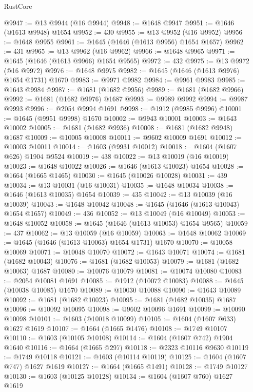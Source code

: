 \begin{lexlean}{RustCore}
\begin{coremodule}
@9947 := @13 @9944 (@16 @9944)
@9948 := @1648 @9947
@9951 := @1646 (@1613 @9948) @1654
@9952 := 430
@9955 := @13 @9952 (@16 @9952)
@9956 := @1648 @9955
@9961 := @1645 (@1646 (@1613 @9956) @1654 @1657)
@9962 := 431
@9965 := @13 @9962 (@16 @9962)
@9966 := @1648 @9965
@9971 := @1645 (@1646 (@1613 @9966) @1654 @9565)
@9972 := 432
@9975 := @13 @9972 (@16 @9972)
@9976 := @1648 @9975
@9982 := @1645 (@1646 (@1613 @9976) @1654 @1731) @1670
@9983 := @9971 @9982
@9984 := @9961 @9983
@9985 := @1643 @9984
@9987 := @1681 (@1682 @9956)
@9989 := @1681 (@1682 @9966)
@9992 := @1681 (@1682 @9976) @1687
@9993 := @9989 @9992
@9994 := @9987 @9993
@9996 := @2054 @9994 @1691
@9998 := @1912 (@9985 @9996)
@10001 := @1645 (@9951 @9998) @1670
@10002 := @9943 @10001
@10003 := @1643 @10002
@10005 := @1681 (@1682 @9936)
@10008 := @1681 (@1682 @9948) @1687
@10009 := @10005 @10008
@10011 := @9602 @10009 @1691
@10012 := @10003 @10011
@10014 := @1603 (@9931 @10012)
@10018 := @1604 (@1607 @626) @1904 @9524
@10019 := 438
@10022 := @13 @10019 (@16 @10019)
@10023 := @1648 @10022
@10026 := @1646 (@1613 @10023) @1654
@10028 := @1664 (@1665 @1465)
@10030 := @1645 (@10026 @10028)
@10031 := 439
@10034 := @13 @10031 (@16 @10031)
@10035 := @1648 @10034
@10038 := @1646 (@1613 @10035) @1654
@10039 := 435
@10042 := @13 @10039 (@16 @10039)
@10043 := @1648 @10042
@10048 := @1645 (@1646 (@1613 @10043) @1654 @1657)
@10049 := 436
@10052 := @13 @10049 (@16 @10049)
@10053 := @1648 @10052
@10058 := @1645 (@1646 (@1613 @10053) @1654 @9565)
@10059 := 437
@10062 := @13 @10059 (@16 @10059)
@10063 := @1648 @10062
@10069 := @1645 (@1646 (@1613 @10063) @1654 @1731) @1670
@10070 := @10058 @10069
@10071 := @10048 @10070
@10072 := @1643 @10071
@10074 := @1681 (@1682 @10043)
@10076 := @1681 (@1682 @10053)
@10079 := @1681 (@1682 @10063) @1687
@10080 := @10076 @10079
@10081 := @10074 @10080
@10083 := @2054 @10081 @1691
@10085 := @1912 (@10072 @10083)
@10088 := @1645 (@10038 @10085) @1670
@10089 := @10030 @10088
@10090 := @1643 @10089
@10092 := @1681 (@1682 @10023)
@10095 := @1681 (@1682 @10035) @1687
@10096 := @10092 @10095
@10098 := @9602 @10096 @1691
@10099 := @10090 @10098
@10101 := @1603 (@10018 @10099)
@10105 := @1604 (@1607 @633) @1627 @1619
@10107 := @1664 (@1665 @1476)
@10108 := @1749 @10107
@10110 := @1603 (@10105 @10108)
@10114 := @1604 (@1607 @742) @1904 @1640
@10116 := @1664 (@1665 @297)
@10118 := @2323 @10116 @9630
@10119 := @1749 @10118
@10121 := @1603 (@10114 @10119)
@10125 := @1604 (@1607 @747) @1627 @1619
@10127 := @1664 (@1665 @1491)
@10128 := @1749 @10127
@10130 := @1603 (@10125 @10128)
@10134 := @1604 (@1607 @760) @1627 @1619

\end{coremodule}
\end{lexlean}
